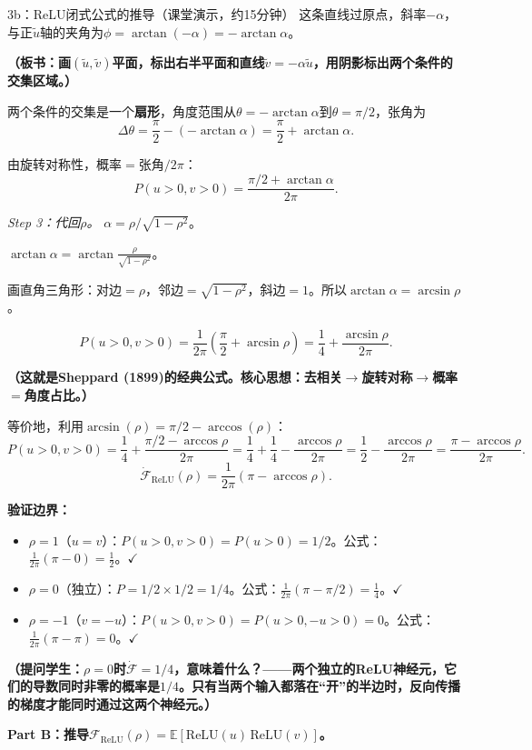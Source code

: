 \documentclass[11pt,a4paper]{article}
\newcommand{\E}{\mathbb{E}}
\begin{document}
\begin{handcalc}{3b：ReLU闭式公式的推导（课堂演示，约15分钟）}
这条直线过原点，斜率$-\alpha$，与正$\tilde u$轴的夹角为$\phi = \arctan(-\alpha) = -\arctan\alpha$。

\textbf{（板书：画$(\tilde u,\tilde v)$平面，标出右半平面和直线$\tilde v=-\alpha\tilde u$，用阴影标出两个条件的交集区域。）}

两个条件的交集是一个\textbf{扇形}，角度范围从$\theta=-\arctan\alpha$到$\theta=\pi/2$，张角为
\[
\Delta\theta = \frac{\pi}{2}-(-\arctan\alpha) = \frac{\pi}{2}+\arctan\alpha.
\]

由旋转对称性，概率$=$张角$/2\pi$：
\[
P(u>0,v>0) = \frac{\pi/2+\arctan\alpha}{2\pi}.
\]

\textit{Step 3：代回$\rho$。} $\alpha=\rho/\sqrt{1-\rho^2}$。

$\arctan\alpha = \arctan\frac{\rho}{\sqrt{1-\rho^2}}$。

画直角三角形：对边$=\rho$，邻边$=\sqrt{1-\rho^2}$，斜边$=1$。所以$\arctan\alpha = \arcsin\rho$。

\[
\boxed{P(u>0,v>0) = \frac{1}{2\pi}\left(\frac{\pi}{2}+\arcsin\rho\right) = \frac{1}{4}+\frac{\arcsin\rho}{2\pi}.}
\]

\textbf{（这就是Sheppard (1899)的经典公式。核心思想：去相关$\to$旋转对称$\to$概率$=$角度占比。）}

等价地，利用$\arcsin(\rho)=\pi/2-\arccos(\rho)$：
\[
P(u>0, v>0) = \frac{1}{4}+\frac{\pi/2-\arccos\rho}{2\pi} = \frac{1}{4}+\frac{1}{4}-\frac{\arccos\rho}{2\pi} = \frac{1}{2}-\frac{\arccos\rho}{2\pi} = \frac{\pi-\arccos\rho}{2\pi}.
\]
\[
\boxed{\dot{\mathcal{F}}_{\text{ReLU}}(\rho) = \frac{1}{2\pi}(\pi-\arccos\rho).}
\]

\textbf{验证边界：}
\begin{itemize}[leftmargin=*]
\item $\rho=1$（$u=v$）：$P(u>0,v>0)=P(u>0)=1/2$。公式：$\frac{1}{2\pi}(\pi-0)=\frac{1}{2}$。$\checkmark$
\item $\rho=0$（独立）：$P=1/2\times 1/2=1/4$。公式：$\frac{1}{2\pi}(\pi-\pi/2)=\frac{1}{4}$。$\checkmark$
\item $\rho=-1$（$v=-u$）：$P(u>0,v>0)=P(u>0,-u>0)=0$。公式：$\frac{1}{2\pi}(\pi-\pi)=0$。$\checkmark$
\end{itemize}

\textbf{（提问学生：$\rho=0$时$\dot{\mathcal{F}}=1/4$，意味着什么？——两个独立的ReLU神经元，它们的导数同时非零的概率是$1/4$。只有当两个输入都落在``开''的半边时，反向传播的梯度才能同时通过这两个神经元。）}

\bigskip
\textbf{Part B：推导$\mathcal{F}_{\text{ReLU}}(\rho) = \E[\text{ReLU}(u)\,\text{ReLU}(v)]$。}


\end{handcalc}
\end{document}
